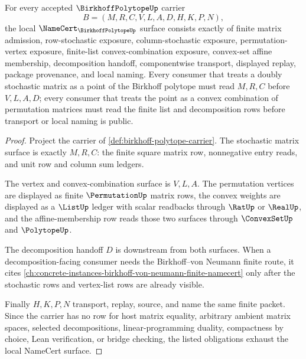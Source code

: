 \begin{theorem}
\label{thm:birkhoff-polytope-namecert-obligations}
For every accepted $\BirkhoffPolytopeUp$ carrier
$$
B=(M,R,C,V,L,A,D,H,K,P,N),
$$
the local $\NameCert_{\BirkhoffPolytopeUp}$ surface consists exactly of finite matrix admission, row-stochastic exposure, column-stochastic exposure, permutation-vertex exposure, finite-list convex-combination exposure, convex-set affine membership, decomposition handoff, componentwise transport, displayed replay, package provenance, and local naming. Every consumer that treats a doubly stochastic matrix as a point of the Birkhoff polytope must read $M,R,C$ before $V,L,A,D$; every consumer that treats the point as a convex combination of permutation matrices must read the finite list and decomposition rows before transport or local naming is public.
\end{theorem}
\begin{proof}
Project the carrier of \autoref{def:birkhoff-polytope-carrier}. The stochastic matrix surface is exactly $M,R,C$: the finite square matrix row, nonnegative entry reads, and unit row and column sum ledgers.

The vertex and convex-combination surface is $V,L,A$. The permutation vertices are displayed as finite $\PermutationUp$ matrix rows, the convex weights are displayed as a $\ListUp$ ledger with scalar readbacks through $\RatUp$ or $\RealUp$, and the affine-membership row reads those two surfaces through $\ConvexSetUp$ and $\PolytopeUp$.

The decomposition handoff $D$ is downstream from both surfaces. When a decomposition-facing consumer needs the Birkhoff--von Neumann finite route, it cites \autoref{ch:concrete-instances-birkhoff-von-neumann-finite-namecert} only after the stochastic rows and vertex-list rows are already visible.

Finally $H,K,P,N$ transport, replay, source, and name the same finite packet. Since the carrier has no row for host matrix equality, arbitrary ambient matrix spaces, selected decompositions, linear-programming duality, compactness by choice, Lean verification, or bridge checking, the listed obligations exhaust the local NameCert surface.
\end{proof}

